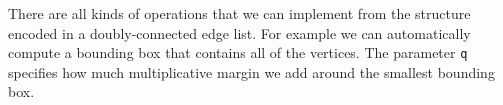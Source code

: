 \documentclass[
  letterpaper,
  DIV=11,
  numbers=noendperiod]{scrartcl}
\newenvironment{Shaded}{\begin{snugshade}}{\end{snugshade}}
\newcommand{\AttributeTok}[1]{\textcolor[rgb]{0.40,0.45,0.13}{#1}}
\newcommand{\ConstantTok}[1]{\textcolor[rgb]{0.56,0.35,0.01}{#1}}
\newcommand{\ControlFlowTok}[1]{\textcolor[rgb]{0.00,0.23,0.31}{#1}}
\newcommand{\FunctionTok}[1]{\textcolor[rgb]{0.28,0.35,0.67}{#1}}
\newcommand{\NormalTok}[1]{\textcolor[rgb]{0.00,0.23,0.31}{#1}}
\newcommand{\SpecialCharTok}[1]{\textcolor[rgb]{0.37,0.37,0.37}{#1}}
\newcommand{\StringTok}[1]{\textcolor[rgb]{0.13,0.47,0.30}{#1}}
\begin{document}
\begin{Shaded}
\end{Shaded}

There are all kinds of operations that we can implement from the
structure encoded in a doubly-connected edge list. For example we can
automatically compute a bounding box that contains all of the vertices.
The parameter \texttt{q} specifies how much multiplicative margin we add
around the smallest bounding box.
\end{document}
